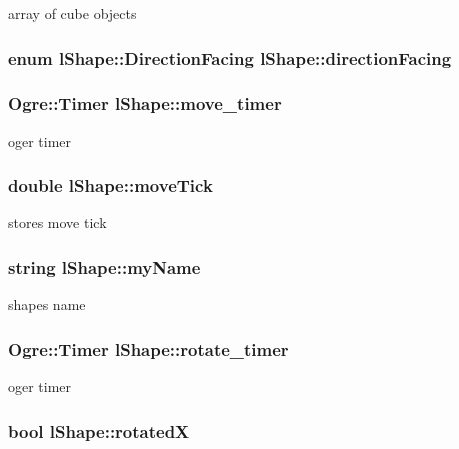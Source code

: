 array of cube objects \hypertarget{classl_shape_a5d3ac0cd0ad9d24ef0e2efed9b4cf1f9}{
\subsubsection[{direction\-Facing}]{\setlength{\rightskip}{0pt plus 5cm}enum {\bf l\-Shape\-::\-Direction\-Facing}  l\-Shape\-::direction\-Facing}}\label{classl_shape_a5d3ac0cd0ad9d24ef0e2efed9b4cf1f9}
\hypertarget{classl_shape_a0bceedaef75e72ab4d7a370029aacf79}{
\subsubsection[{move\-\_\-timer}]{\setlength{\rightskip}{0pt plus 5cm}Ogre\-::\-Timer l\-Shape\-::move\-\_\-timer}}\label{classl_shape_a0bceedaef75e72ab4d7a370029aacf79}
oger timer \hypertarget{classl_shape_ae5a4cca2d42185cdac54913c4a441e55}{
\subsubsection[{move\-Tick}]{\setlength{\rightskip}{0pt plus 5cm}double l\-Shape\-::move\-Tick}}\label{classl_shape_ae5a4cca2d42185cdac54913c4a441e55}
stores move tick \hypertarget{classl_shape_a1bb0113067c1604bfe18713d78722b7e}{
\subsubsection[{my\-Name}]{\setlength{\rightskip}{0pt plus 5cm}string l\-Shape\-::my\-Name}}\label{classl_shape_a1bb0113067c1604bfe18713d78722b7e}
shapes name \hypertarget{classl_shape_af2516a8beb39e1a722ddb421199a23b0}{
\subsubsection[{rotate\-\_\-timer}]{\setlength{\rightskip}{0pt plus 5cm}Ogre\-::\-Timer l\-Shape\-::rotate\-\_\-timer}}\label{classl_shape_af2516a8beb39e1a722ddb421199a23b0}
oger timer \hypertarget{classl_shape_aeeabb04f47a8d183936e22fc2f42bbf4}{
\subsubsection[{rotated\-X}]{\setlength{\rightskip}{0pt plus 5cm}bool l\-Shape\-::rotated\-X}}\label{classl_shape_aeeabb04f47a8d183936e22fc2f42bbf4}
